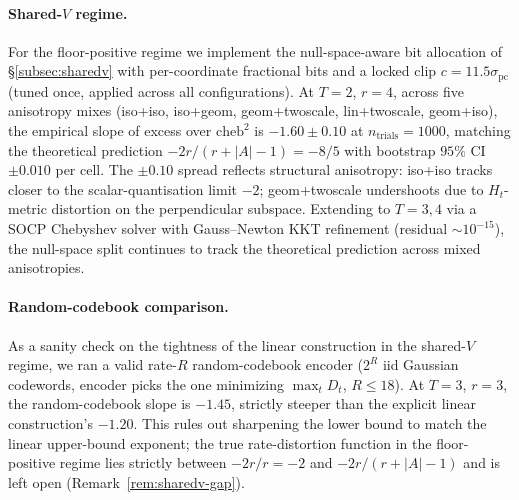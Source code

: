 \paragraph{Shared-$V$ regime.} For the floor-positive regime we
implement the null-space-aware bit allocation of \S\ref{subsec:sharedv}
with per-coordinate fractional bits and a locked clip
$c = 11.5\sigma_{\mathrm{pc}}$ (tuned once, applied across all
configurations). At $T = 2$, $r = 4$, across five anisotropy mixes
(iso+iso, iso+geom, geom+twoscale, lin+twoscale, geom+iso), the
empirical slope of excess over $\mathrm{cheb}^2$ is $-1.60 \pm 0.10$ at
$n_{\mathrm{trials}} = 1000$, matching the theoretical prediction
$-2r/(r + |A| - 1) = -8/5$ with bootstrap $95\%$ CI $\pm 0.010$ per
cell. The $\pm 0.10$ spread reflects structural anisotropy: iso+iso
tracks closer to the scalar-quantisation limit $-2$; geom+twoscale
undershoots due to $H_t$-metric distortion on the perpendicular
subspace. Extending to $T = 3, 4$ via a SOCP Chebyshev solver with
Gauss--Newton KKT refinement (residual $\sim 10^{-15}$), the null-space
split continues to track the theoretical prediction across mixed
anisotropies.

\paragraph{Random-codebook comparison.} As a sanity check on the
tightness of the linear construction in the shared-$V$ regime, we ran
a valid rate-$R$ random-codebook encoder ($2^R$ iid Gaussian
codewords, encoder picks the one minimizing $\max_t D_t$,
$R \leq 18$). At $T = 3$, $r = 3$, the random-codebook slope is
$-1.45$, strictly steeper than the explicit linear construction's
$-1.20$. This rules out sharpening the lower bound to match the linear
upper-bound exponent; the true rate-distortion function in the
floor-positive regime lies strictly between $-2r/r = -2$ and
$-2r/(r + |A| - 1)$ and is left open (Remark~\ref{rem:sharedv-gap}).
